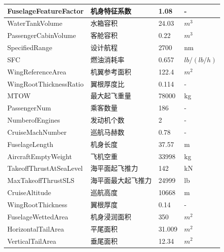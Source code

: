 \documentclass[12pt,a4paper]{report}
\begin{document}
\begin{center}
\begin{longtable}{|p{5.8cm}|p{3.9cm}|p{1.9cm}|p{1.4cm}|}
FuselageFeatureFactor&机身特征系数&1.08&-\\\hline
WaterTankVolume&水箱容积&24.03&$m^3$\\\hline
PassengerCabinVolume&客舱容积&0.22&$m^3$\\\hline
SpecifiedRange&设计航程&2700&nm\\\hline
SFC&燃油消耗率&0.657&$lb/(lb/h)$\\\hline
WingReferenceArea&机翼参考面积&122.4&$m^2$\\\hline
WingRootThicknessRatio&翼根厚度比&0.114&-\\\hline
MTOW&最大起飞重量&78000&kg\\\hline
PassengerNum&乘客数量&186&-\\\hline
NumberofEngines&发动机个数&2&-\\\hline
CruiseMachNumber&巡航马赫数&0.78&-\\\hline
FuselageLength&机身长度&37.57&m\\\hline
AircraftEmptyWeight&飞机空重&33998&kg\\\hline
TakeoffThrustAtSeaLevel&海平面起飞推力&142&kN\\\hline

MaxTakeoffThrustSLS&海平面最大起飞推力&24999&lb\\\hline
CruiseAltitude&巡航高度&10668&m\\\hline
WingRootThickness&翼根厚度&0.14&-\\\hline
FuselageWettedArea&机身浸润面积&350&$m^2$\\\hline
HorizontalTailArea&平尾面积&31.009&$m^2$\\\hline
VerticalTailArea&垂尾面积&12.34&$m^2$\\\hline
\end{longtable}
\end{center}
\end{document}
